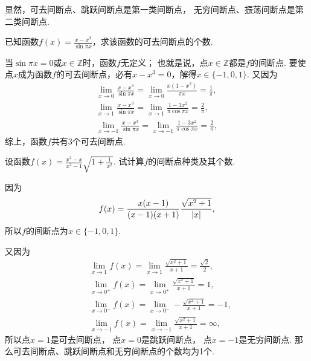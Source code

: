 显然，可去间断点、跳跃间断点是第一类间断点，
无穷间断点、振荡间断点是第二类间断点.

\begin{example}
已知函数\(f(x) = \frac{x-x^3}{\sin \pi x}\)，求该函数的可去间断点的个数.
\begin{solution}
当\(\sin \pi x = 0\)或\(x \in \mathbb{Z}\)时，函数\(f\)无定义；
也就是说，点\(x\in\mathbb{Z}\)都是\(f\)的间断点.
要使点\(x\)成为函数\(f\)的可去间断点，必有\(x-x^3=0\)，解得\(x\in\{-1,0,1\}\).
又因为\begin{gather*}
	\lim_{x\to0} \frac{x-x^3}{\sin \pi x}
	= \lim_{x\to0} \frac{x(1-x^2)}{\pi x}
	= \frac1\pi, \\
	\lim_{x\to1} \frac{x-x^3}{\sin \pi x}
	= \lim_{x\to1} \frac{1-3x^2}{\pi \cos \pi x}
	= \frac2\pi, \\
	\lim_{x\to-1} \frac{x-x^3}{\sin \pi x}
	= \lim_{x\to-1} \frac{1-3x^2}{\pi \cos \pi x}
	= \frac2\pi,
\end{gather*}
综上，函数\(f\)共有3个可去间断点.
\end{solution}
\end{example}

\begin{example}
设函数\(f(x) = \frac{x^2-x}{x^2-1}\sqrt{1+\frac{1}{x^2}}\).
试计算\(f\)的间断点种类及其个数.
\begin{solution}
因为\[
	f(x) = \frac{x(x-1)}{(x-1)(x+1)} \frac{\sqrt{x^2+1}}{\abs{x}},
\]
所以\(f\)的间断点为\(x\in\{-1,0,1\}\).

又因为\begin{align*}
	&\lim_{x\to1} f(x)
	= \lim_{x\to1} \frac{\sqrt{x^2+1}}{x+1}
	= \frac{\sqrt{2}}{2}, \\
	&\lim_{x\to0^+} f(x)
	= \lim_{x\to0^+} \frac{\sqrt{x^2+1}}{x+1}
	= 1, \\
	&\lim_{x\to0^-} f(x)
	= \lim_{x\to0^-} -\frac{\sqrt{x^2+1}}{x+1}
	= -1, \\
	&\lim_{x\to-1} f(x)
	= \lim_{x\to-1} \frac{\sqrt{x^2+1}}{x+1}
	= \infty,
\end{align*}
所以点\(x=1\)是可去间断点，
点\(x=0\)是跳跃间断点，
点\(x=-1\)是无穷间断点.
那么可去间断点、跳跃间断点和无穷间断点的个数均为1个.
\end{solution}
\end{example}

